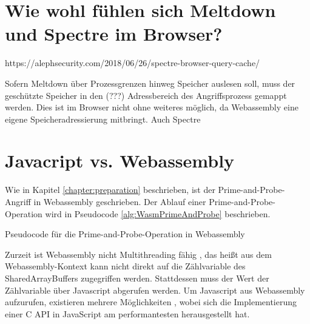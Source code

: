 \section{Wie wohl fühlen sich Meltdown und Spectre im Browser?}
\label{MeltdownSpectreBrowser}

https://alephsecurity.com/2018/06/26/spectre-browser-query-cache/
\cite{OvercomingSpectreBrowserMitigations}

Sofern Meltdown über Prozessgrenzen hinweg Speicher auslesen soll, muss der geschützte Speicher in den (???) Adressbereich des Angriffsprozess gemappt werden.
Dies ist im Browser nicht ohne weiteres möglich, da Webassembly eine eigene Speicheradressierung mitbringt.
Auch Spectre



\section{Javacript vs. Webassembly}

Wie in Kapitel \ref{chapter:preparation} beschrieben, ist der Prime-and-Probe-Angriff in Webassembly geschrieben.
Der Ablauf einer Prime-and-Probe-Operation wird in Pseudocode \ref{alg:WasmPrimeAndProbe} beschrieben.

\begin{algorithm}[h]
\DontPrintSemicolon
\caption{Pseudocode für die Prime-and-Probe-Operation in Webassembly}
\label{alg:WasmPrimeAndProbe}

\end{algorithm}

Zurzeit ist Webassembly nicht Multithreading fähig \cite{WebassemblyThreads}, das heißt aus dem Webassembly-Kontext kann nicht direkt auf die Zählvariable des SharedArrayBuffers zugegriffen werden.
Stattdessen muss der Wert der Zählvariable über Javascript abgerufen werden.
Um Javascript aus Webassembly aufzurufen, existieren mehrere Möglichkeiten \cite{CallJavaScriptFromWasm}, wobei sich die Implementierung einer C API in JavaScript am performantesten herausgestellt hat.

